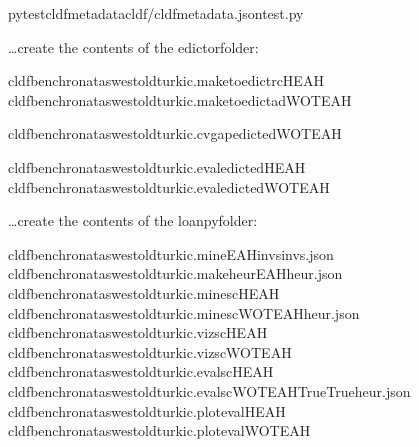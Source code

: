 \documentclass[letterpaper,10pt,english]{sphinxmanual}
\begin{document}
{{{{\begin{sphinxVerbatim}[commandchars=\\\{\}]
pytest\PYGZhy{}\PYGZhy{}cldf\PYGZhy{}metadatacldf/cldf\PYGZhy{}metadata.jsontest.py
\end{sphinxVerbatim}

\sphinxAtStartPar
…create the contents of the edictor\sphinxhyphen{}folder:

\begin{sphinxVerbatim}[commandchars=\\\{\}]
cldfbenchronataswestoldturkic.maketoedict\PYGZus{}rcHEAH
cldfbenchronataswestoldturkic.maketoedict\PYGZus{}adWOTEAH

cldfbenchronataswestoldturkic.cvgapedictedWOTEAH

cldfbenchronataswestoldturkic.evaledictedHEAH
cldfbenchronataswestoldturkic.evaledictedWOTEAH
\end{sphinxVerbatim}

\sphinxAtStartPar
…create the contents of the loanpy\sphinxhyphen{}folder:

\begin{sphinxVerbatim}[commandchars=\\\{\}]
cldfbenchronataswestoldturkic.mineEAHinvsinvs.json
cldfbenchronataswestoldturkic.makeheurEAHheur.json
cldfbenchronataswestoldturkic.minescHEAH
cldfbenchronataswestoldturkic.minescWOTEAHheur.json
cldfbenchronataswestoldturkic.vizscHEAH
cldfbenchronataswestoldturkic.vizscWOTEAH
cldfbenchronataswestoldturkic.evalscHEAH
cldfbenchronataswestoldturkic.evalscWOTEAHTrueTrueheur.json
cldfbenchronataswestoldturkic.plot\PYGZus{}evalHEAH
cldfbenchronataswestoldturkic.plot\PYGZus{}evalWOTEAH
\end{sphinxVerbatim}

\sphinxstepscope


}}}}
\end{document}
